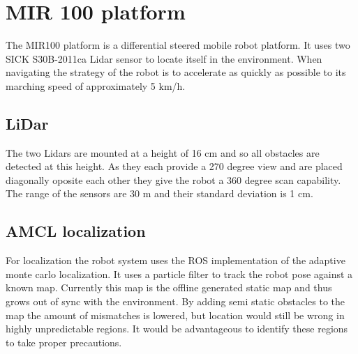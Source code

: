 \section{MIR 100 platform}
The MIR100 platform is a differential steered mobile robot platform.
It uses two SICK S30B-2011ca Lidar sensor to locate itself in the environment. 
When navigating the strategy of the robot is to accelerate as quickly as possible to its marching speed of approximately 5 km/h.

\subsection{LiDar}
The two Lidars are mounted at a height of 16 cm and so all obstacles are detected at this height. As they each provide a 270 degree view and are placed diagonally oposite each other they give the robot a 360 degree scan capability. The range of the sensors are 30 m and their standard deviation is 1 cm.


\subsection{AMCL localization}
For localization the robot system uses the ROS implementation of the adaptive monte carlo localization. It uses a particle filter to track the robot pose against a known map. 
Currently this map is the offline generated static map and thus grows out of sync with the environment.
By adding semi static obstacles to the map the amount of mismatches is lowered, but location would still be wrong in highly unpredictable regions. It would be advantageous to identify these regions to take proper precautions.




